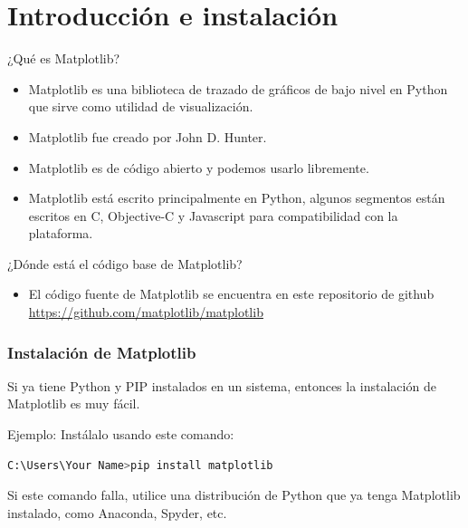 
\section{Introducción e instalación}

\begin{frame}[c]{¿Qué es Matplotlib?}
  \begin{itemize}
    \item Matplotlib es una biblioteca de trazado de gráficos de bajo
          nivel en Python que sirve como utilidad de visualización.
    \pausa
    \item Matplotlib fue creado por John D. Hunter.
    \pausa
    \item Matplotlib es de código abierto y podemos usarlo libremente.
    \pausa
    \item Matplotlib está escrito principalmente en Python, algunos
          segmentos están escritos en C, Objective-C y Javascript
          para compatibilidad con la plataforma.
  \end{itemize}
\end{frame}

\begin{frame}[c]{¿Dónde está el código base de Matplotlib?}
  \begin{itemize}
    \item El código fuente de Matplotlib se encuentra en este
      repositorio de github
      \href{https://github.com/matplotlib/matplotlib}
      {https://github.com/matplotlib/matplotlib}
  \end{itemize}
\end{frame}

\begin{frame}[fragile]
  \frametitle{Instalación de Matplotlib}
    Si ya tiene Python y PIP instalados en un sistema,
    entonces la instalación de Matplotlib es muy fácil.

  \begin{exampleblock}{Ejemplo:}
    Instálalo usando este comando:
    \begin{lstlisting}[language=Python]
C:\Users\Your Name>pip install matplotlib 
    \end{lstlisting}
  \end{exampleblock}
  Si este comando falla, utilice una distribución de Python que
  ya tenga Matplotlib instalado, como Anaconda, Spyder, etc.
\end{frame}

